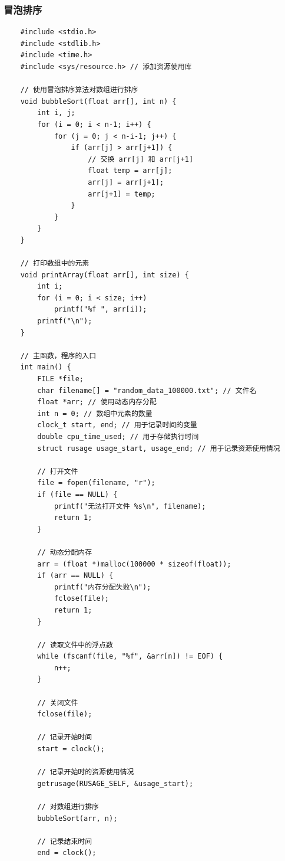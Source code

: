 \documentclass[UTF8]{ctexart}
\begin{document}
\subsubsection{冒泡排序}
\begin{lstlisting}
    #include <stdio.h>
    #include <stdlib.h>
    #include <time.h>
    #include <sys/resource.h> // 添加资源使用库
    
    // 使用冒泡排序算法对数组进行排序
    void bubbleSort(float arr[], int n) {
        int i, j;
        for (i = 0; i < n-1; i++) {
            for (j = 0; j < n-i-1; j++) {
                if (arr[j] > arr[j+1]) {
                    // 交换 arr[j] 和 arr[j+1]
                    float temp = arr[j];
                    arr[j] = arr[j+1];
                    arr[j+1] = temp;
                }
            }
        }
    }
    
    // 打印数组中的元素
    void printArray(float arr[], int size) {
        int i;
        for (i = 0; i < size; i++)
            printf("%f ", arr[i]);
        printf("\n");
    }
    
    // 主函数，程序的入口
    int main() {
        FILE *file;
        char filename[] = "random_data_100000.txt"; // 文件名
        float *arr; // 使用动态内存分配
        int n = 0; // 数组中元素的数量
        clock_t start, end; // 用于记录时间的变量
        double cpu_time_used; // 用于存储执行时间
        struct rusage usage_start, usage_end; // 用于记录资源使用情况
    
        // 打开文件
        file = fopen(filename, "r");
        if (file == NULL) {
            printf("无法打开文件 %s\n", filename);
            return 1;
        }
    
        // 动态分配内存
        arr = (float *)malloc(100000 * sizeof(float));
        if (arr == NULL) {
            printf("内存分配失败\n");
            fclose(file);
            return 1;
        }
    
        // 读取文件中的浮点数
        while (fscanf(file, "%f", &arr[n]) != EOF) {
            n++;
        }
    
        // 关闭文件
        fclose(file);
    
        // 记录开始时间
        start = clock();
    
        // 记录开始时的资源使用情况
        getrusage(RUSAGE_SELF, &usage_start);
    
        // 对数组进行排序
        bubbleSort(arr, n);
    
        // 记录结束时间
        end = clock();
    

\end{lstlisting}
\end{document}
